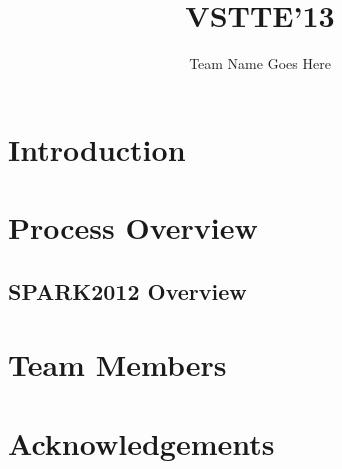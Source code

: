 \documentclass{report}
\title{VSTTE'13}
\author{Team Name Goes Here}
\begin{document}
\maketitle

\chapter{Introduction}


\chapter{Process Overview}
\label{ProcessSummary}


\section{SPARK2012 Overview}


% 


\chapter{Team Members}


\chapter{Acknowledgements}

\end{document}
